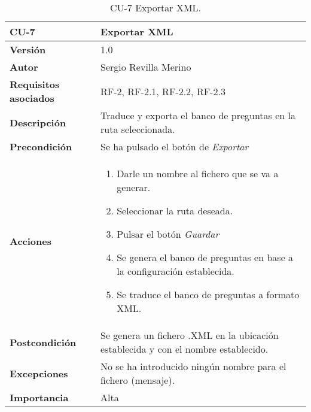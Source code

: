 \begin{table}[h]
	\centering
	\begin{tabularx}{\linewidth}{ p{} p{} }
		\toprule
		\textbf{CU-7}    & \textbf{Exportar XML}\\
		\toprule
		\textbf{Versión}              & 1.0    \\
		\textbf{Autor}                & Sergio Revilla Merino \\
		\textbf{Requisitos asociados} & RF-2, RF-2.1, RF-2.2, RF-2.3 \\
		\textbf{Descripción}          & Traduce y exporta el banco de preguntas en la ruta seleccionada.  \\
		\textbf{Precondición}         & Se ha pulsado el botón de \textit{Exportar} \\
		\textbf{Acciones}             &
		\begin{enumerate}
			\def\labelenumi{\arabic{enumi}.}
			\tightlist
            \item Darle un nombre al fichero que se va a generar.
            \item Seleccionar la ruta deseada.
            \item Pulsar el botón \textit{Guardar}
            \item Se genera el banco de preguntas en base a la configuración establecida.
            \item Se traduce el banco de preguntas a formato XML.
		\end{enumerate} \\
		\textbf{Postcondición}        & Se genera un fichero .XML en la ubicación establecida y con el nombre establecido.\\
		\textbf{Excepciones}          & No se ha introducido ningún nombre para el fichero (mensaje). \\
		\textbf{Importancia}          & Alta \\
		\bottomrule
	\end{tabularx}
	\caption{CU-7 Exportar XML.}
\end{table}

